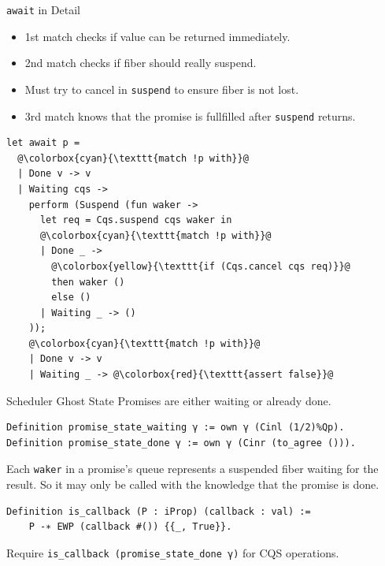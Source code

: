 \documentclass[aspectratio=43]{beamer}
\newcommand{\ocaml}[1]{\texttt{#1}}
\newcommand{\coq}[1]{\texttt{#1}}
\begin{document}
\begin{frame}[fragile]{\ocaml{await} in Detail}
    \begin{adjustwidth}{-2em}{0em}
        \begin{minipage}{0.4\textwidth}
            \begin{itemize}
                \item 1st match checks if value can be returned immediately.
                \item 2nd match checks if fiber should really suspend.
                \item Must try to cancel in \ocaml{suspend} to ensure fiber is not lost.
                \item 3rd match knows that the promise is fullfilled after \ocaml{suspend} returns.
            \end{itemize}
        \end{minipage}
        \begin{minipage}{0.5\textwidth}
            \begin{verbatim}
let await p =
  @\colorbox{cyan}{\texttt{match !p with}}@
  | Done v -> v
  | Waiting cqs ->
    perform (Suspend (fun waker ->
      let req = Cqs.suspend cqs waker in
      @\colorbox{cyan}{\texttt{match !p with}}@
      | Done _ -> 
        @\colorbox{yellow}{\texttt{if (Cqs.cancel cqs req)}}@
        then waker ()
        else ()
      | Waiting _ -> ()
    ));
    @\colorbox{cyan}{\texttt{match !p with}}@
    | Done v -> v
    | Waiting _ -> @\colorbox{red}{\texttt{assert false}}@
\end{verbatim}
        \end{minipage}
    \end{adjustwidth}
\end{frame}

\begin{frame}[fragile]{Scheduler Ghost State}
    Promises are either waiting or already done.\newline
    \begin{verbatim}
Definition promise_state_waiting γ := own γ (Cinl (1/2)%Qp).
Definition promise_state_done γ := own γ (Cinr (to_agree ())).
    \end{verbatim}
    Each \ocaml{waker} in a promise's queue represents a suspended fiber waiting for the result. So it may only be called with the knowledge that the promise is done.
    \begin{verbatim}
Definition is_callback (P : iProp) (callback : val) := 
    P -∗ EWP (callback #()) {{_, True}}.
    \end{verbatim}
    Require \coq{is_callback (promise_state_done γ)} for CQS operations.
\end{frame}
\end{document}
